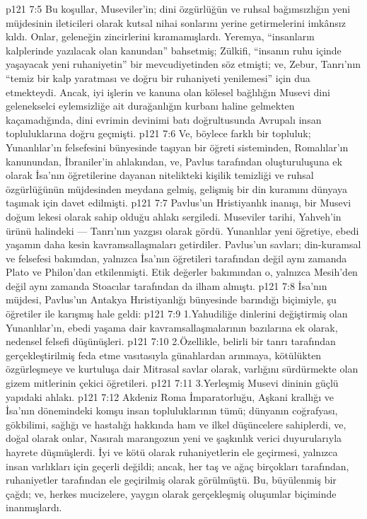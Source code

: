 \vs p121 7:5 Bu koşullar, Museviler’in; dini özgürlüğün ve ruhsal bağımsızlığın yeni müjdesinin ileticileri olarak kutsal nihai sonlarını yerine getirmelerini imkânsız kıldı. Onlar, geleneğin zincirlerini kıramamışlardı. Yeremya, “insanların kalplerinde yazılacak olan kanundan” bahsetmiş; Zülkifi, “insanın ruhu içinde yaşayacak yeni ruhaniyetin” bir mevcudiyetinden söz etmişti; ve, Zebur, Tanrı’nın “temiz bir kalp yaratması ve doğru bir ruhaniyeti yenilemesi” için dua etmekteydi. Ancak, iyi işlerin ve kanuna olan kölesel bağlılığın Musevi dini gelenekselci eylemsizliğe ait durağanlığın kurbanı haline gelmekten kaçamadığında, dini evrimin devinimi batı doğrultusunda Avrupalı insan topluluklarına doğru geçmişti.
\vs p121 7:6 Ve, böylece farklı bir topluluk; Yunanlılar’ın felsefesini bünyesinde taşıyan bir öğreti sisteminden, Romalılar’ın kanunundan, İbraniler’in ahlakından, ve, Pavlus tarafından oluşturuluşuna ek olarak İsa’nın öğretilerine dayanan nitelikteki kişilik temizliği ve ruhsal özgürlüğünün müjdesinden meydana gelmiş, gelişmiş bir din kuramını dünyaya taşımak için davet edilmişti.
\vs p121 7:7 Pavlus’un Hristiyanlık inanışı, bir Musevi doğum lekesi olarak sahip olduğu ahlakı sergiledi. Museviler tarihi, Yahveh’in ürünü halindeki --- Tanrı’nın yazgısı olarak gördü. Yunanlılar yeni öğretiye, ebedi yaşamın daha kesin kavramsallaşmaları getirdiler. Pavlus’un savları; din\hyp{}kuramsal ve felsefesi bakımdan, yalnızca İsa’nın öğretileri tarafından değil aynı zamanda Plato ve Philon’dan etkilenmişti. Etik değerler bakımından o, yalnızca Mesih’den değil aynı zamanda Stoacılar tarafından da ilham almıştı.
\vs p121 7:8 İsa’nın müjdesi, Pavlus’un Antakya Hıristiyanlığı bünyesinde barındığı biçimiyle, şu öğretiler ile karışmış hale geldi:
\vs p121 7:9 1.\bibnobreakspace Yahudiliğe dinlerini değiştirmiş olan Yunanlılar’ın, ebedi yaşama dair kavramsallaşmalarının bazılarına ek olarak, nedensel felsefi düşünüşleri.
\vs p121 7:10 2.\bibnobreakspace Özellikle, belirli bir tanrı tarafından gerçekleştirilmiş feda etme vasıtasıyla günahlardan arınmaya, kötülükten özgürleşmeye ve kurtuluşa dair Mitrasal savlar olarak, varlığını sürdürmekte olan gizem mitlerinin çekici öğretileri.
\vs p121 7:11 3.\bibnobreakspace Yerleşmiş Musevi dininin güçlü yapıdaki ahlakı.
\vs p121 7:12 Akdeniz Roma İmparatorluğu, Aşkani krallığı ve İsa’nın dönemindeki komşu insan topluluklarının tümü; dünyanın coğrafyası, gökbilimi, sağlığı ve hastalığı hakkında ham ve ilkel düşüncelere sahiplerdi, ve, doğal olarak onlar, Nasıralı marangozun yeni ve şaşkınlık verici duyurularıyla hayrete düşmüşlerdi. İyi ve kötü olarak ruhaniyetlerin ele geçirmesi, yalnızca insan varlıkları için geçerli değildi; ancak, her taş ve ağaç birçokları tarafından, ruhaniyetler tarafından ele geçirilmiş olarak görülmüştü. Bu, büyülenmiş bir çağdı; ve, herkes mucizelere, yaygın olarak gerçekleşmiş oluşumlar biçiminde inanmışlardı.
